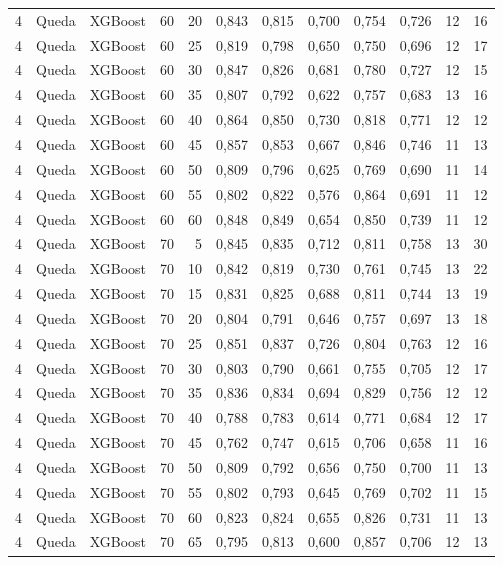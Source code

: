 \begin{longtable}{ccclrrrrrrrr}
4 & Queda & XGBoost & 60 & 20 & 0,843 & 0,815 & 0,700 & 0,754 & 0,726 & 12 & 16 \\
4 & Queda & XGBoost & 60 & 25 & 0,819 & 0,798 & 0,650 & 0,750 & 0,696 & 12 & 17 \\
4 & Queda & XGBoost & 60 & 30 & 0,847 & 0,826 & 0,681 & 0,780 & 0,727 & 12 & 15 \\
4 & Queda & XGBoost & 60 & 35 & 0,807 & 0,792 & 0,622 & 0,757 & 0,683 & 13 & 16 \\
4 & Queda & XGBoost & 60 & 40 & 0,864 & 0,850 & 0,730 & 0,818 & 0,771 & 12 & 12 \\
4 & Queda & XGBoost & 60 & 45 & 0,857 & 0,853 & 0,667 & 0,846 & 0,746 & 11 & 13 \\
4 & Queda & XGBoost & 60 & 50 & 0,809 & 0,796 & 0,625 & 0,769 & 0,690 & 11 & 14 \\
4 & Queda & XGBoost & 60 & 55 & 0,802 & 0,822 & 0,576 & 0,864 & 0,691 & 11 & 12 \\
4 & Queda & XGBoost & 60 & 60 & 0,848 & 0,849 & 0,654 & 0,850 & 0,739 & 11 & 12 \\
4 & Queda & XGBoost & 70 & 5 & 0,845 & 0,835 & 0,712 & 0,811 & 0,758 & 13 & 30 \\
4 & Queda & XGBoost & 70 & 10 & 0,842 & 0,819 & 0,730 & 0,761 & 0,745 & 13 & 22 \\
4 & Queda & XGBoost & 70 & 15 & 0,831 & 0,825 & 0,688 & 0,811 & 0,744 & 13 & 19 \\
4 & Queda & XGBoost & 70 & 20 & 0,804 & 0,791 & 0,646 & 0,757 & 0,697 & 13 & 18 \\
4 & Queda & XGBoost & 70 & 25 & 0,851 & 0,837 & 0,726 & 0,804 & 0,763 & 12 & 16 \\
4 & Queda & XGBoost & 70 & 30 & 0,803 & 0,790 & 0,661 & 0,755 & 0,705 & 12 & 17 \\
4 & Queda & XGBoost & 70 & 35 & 0,836 & 0,834 & 0,694 & 0,829 & 0,756 & 12 & 12 \\
4 & Queda & XGBoost & 70 & 40 & 0,788 & 0,783 & 0,614 & 0,771 & 0,684 & 12 & 17 \\
4 & Queda & XGBoost & 70 & 45 & 0,762 & 0,747 & 0,615 & 0,706 & 0,658 & 11 & 16 \\
4 & Queda & XGBoost & 70 & 50 & 0,809 & 0,792 & 0,656 & 0,750 & 0,700 & 11 & 13 \\
4 & Queda & XGBoost & 70 & 55 & 0,802 & 0,793 & 0,645 & 0,769 & 0,702 & 11 & 15 \\
4 & Queda & XGBoost & 70 & 60 & 0,823 & 0,824 & 0,655 & 0,826 & 0,731 & 11 & 13 \\
4 & Queda & XGBoost & 70 & 65 & 0,795 & 0,813 & 0,600 & 0,857 & 0,706 & 12 & 13 \\

\end{longtable}
